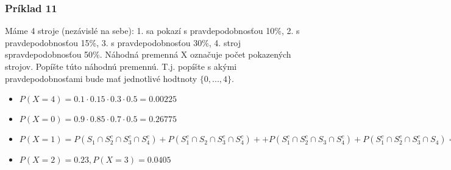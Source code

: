 \documentclass{beamer}
\begin{document}
\begin{frame}
\frametitle{Príklad 11}
Máme 4 stroje (nezávislé na sebe): 1. sa pokazí s pravdepodobnosťou 10\%, 2. s pravdepodobnosťou 15\%, 3. s pravdepodobnosťou 30\%, 4. stroj spravdepodobnosťou 50\%. Náhodná premenná X označuje počet pokazených strojov. Popíšte túto náhodnú premennú. T.j. popíšte s akými pravdepodobnosťami bude mať jednotlivé hodtnoty $\{0, ...,4\}$.

\begin{itemize}
\item<2-> $P(X = 4) = 0.1 \cdot 0.15  \cdot 0.3  \cdot 0.5 = 0.00225$
\item<3-> $P(X = 0) = 0.9 \cdot 0.85  \cdot 0.7  \cdot 0.5 = 0.26775$
\item<4-> $P(X = 1) = P(S_1 \cap S_2^c \cap S_3^c \cap S_4^c) + P(S_1^c \cap S_2 \cap S_3^c \cap S_4^c) + + P(S_1^c \cap S_2^c \cap S_3 \cap S_4^c) + P(S_1^c \cap S_2^c \cap S_3^c \cap S_4) = 0.4595$
\item<5-> $P(X = 2) = 0.23, P(X = 3) = 0.0405$ 
\end{itemize}
\end{frame}
\end{document}
